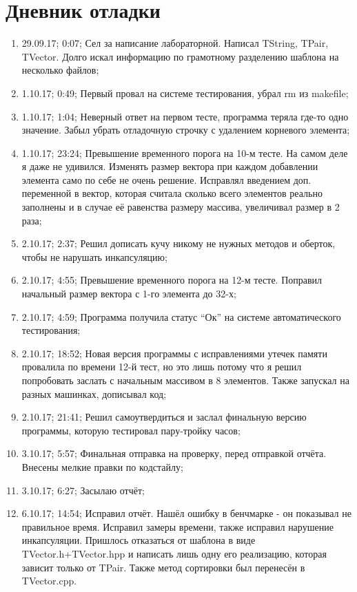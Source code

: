 \documentclass[pdf, unicode, 12pt, a4paper,oneside,fleqn]{article}
\begin{document}
\section{Дневник отладки}
\begin{enumerate}
\item 29.09.17; 0:07; Сел за написание лабораторной. Написал TString, TPair, TVector. Долго искал информацию по грамотному разделению шаблона на несколько файлов;
\item 1.10.17; 0:49; Первый провал на системе тестирования, убрал rm из makefile;
\item 1.10.17; 1:04; Неверный ответ на первом тесте, программа теряла где-то одно значение. Забыл убрать отладочную строчку с удалением корневого элемента;
\item 1.10.17; 23:24; Превышение временного порога на 10-м тесте. На самом деле я даже не удивился. Изменять размер вектора при каждом добавлении элемента само по себе не очень решение. Исправлял введением доп. переменной в вектор, которая считала сколько всего элементов реально заполнены и в случае её равенства размеру массива, увеличивал размер в 2 раза;
\item 2.10.17; 2:37; Решил дописать кучу никому не нужных методов и оберток, чтобы не нарушать инкапсуляцию;
\item 2.10.17; 4:55; Превышение временного порога на 12-м тесте. Поправил начальный размер вектора с 1-го элемента до 32-х;
\item 2.10.17; 4:59; Программа получила статус \enquote{Ок} на системе автоматического тестирования;
\item 2.10.17; 18:52; Новая версия программы с исправлениями утечек памяти провалила по времени 12-й тест, но это лишь потому что я решил попробовать заслать с начальным массивом в 8 элементов. Также запускал на разных машинках, дописывал код;
\item 2.10.17; 21:41; Решил самоутвердиться и заслал финальную версию программы, которую тестировал пару-тройку часов;
\item 3.10.17; 5:57; Финальная отправка на проверку, перед отправкой отчёта. Внесены мелкие правки по кодстайлу;
\item 3.10.17; 6:27; Засылаю отчёт;
\item 6.10.17; 14:54; Исправил отчёт. Нашёл ошибку в бенчмарке - он показывал не правильное время. Исправил замеры времени, также исправил нарушение инкапсуляции. Пришлось отказаться от шаблона в виде TVector.h+TVector.hpp и написать лишь одну его реализацию, которая зависит только от TPair. Также метод сортировки был перенесён в TVector.cpp.
 \end{enumerate}
 \pagebreak
\end{document}
